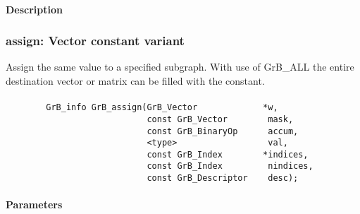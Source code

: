 \paragraph{Description}

\subsubsection{{\sf assign}: Vector constant variant}

Assign the same value to a specified subgraph.  With use of {\sf GrB\_ALL} the entire
destination vector or matrix can be filled with the constant.


\paragraph{\syntax}

\begin{verbatim}
        GrB_info GrB_assign(GrB_Vector             *w,
                            const GrB_Vector        mask,
                            const GrB_BinaryOp      accum,
                            <type>                  val,
                            const GrB_Index        *indices,
                            const GrB_Index         nindices,
                            const GrB_Descriptor    desc);
\end{verbatim}

\paragraph{Parameters}

